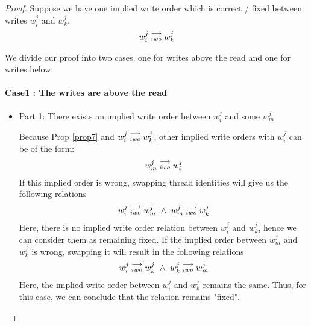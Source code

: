         \begin{proof}
            Suppose we have one implied write order which is correct / fixed between writes $w_i^j$ and $w_k^j$.
            \begin{align*}
                w_i^j\stackrel{\longrightarrow}{_{iwo}}w_k^j
            \end{align*}
            
            We divide our proof into two cases, one for writes above the read and one for writes below. 

            \paragraph{Case1 : The writes are above the read} 
                
                \begin{itemize}
                    \item Part 1: There exists an implied write order between $w_i^j$ and some $w_m^j$
                    
                        Because Prop \ref{prop7} and $w_i^j\stackrel{\longrightarrow}{_{iwo}}w_k^j$, other implied write orders with $w_i^j$ can be of the form:
                        \begin{align*}
                            w_m^j\stackrel{\longrightarrow}{_{iwo}}w_i^j
                        \end{align*}
                        If this implied order is wrong, swapping thread identities will  give us the following relations 
                        \begin{align*}
                            \reln{w_i^j}{iwo}{w_m^j} \ \wedge \ \reln{w_m^j}{iwo}{w_k^j}  
                        \end{align*}  
                        Here, there is no implied write order relation between $w_i^j$ and $w_k^j$, hence we can consider them as remaining fixed. 
                        If the implied order between $w_m^j$ and $w_k^j$ is wrong, swapping it will result in the following relations
                        \begin{align*}
                            \reln{w_i^j}{iwo}{w_k^j} \ \wedge \ \reln{w_k^j}{iwo}{w_m^j}  
                        \end{align*}  
                        Here, the implied write order between $w_i^j$ and $w_k^j$ remains the same. Thus, for this case, we can conclude    that   the   relation remains "fixed".


\end{itemize}
\end{proof}
